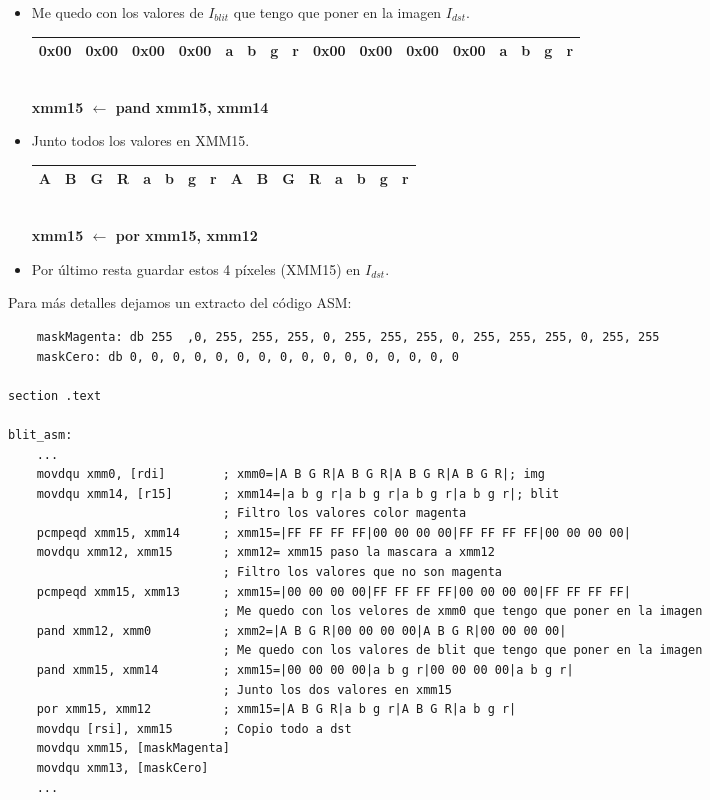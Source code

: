 \begin{itemize}
	\item Me quedo con los valores de $I_{blit}$ que tengo que poner en la imagen $I_{dst}$.
		\begin{center}
		   \begin{tabular}{| c | c | c | c || c | c | c | c || c | c | c | c || c | c | c | c |}
			 \hline
			 0x00 & 0x00 & 0x00 & 0x00 & a & b & g & r & 0x00 & 0x00 & 0x00 & 0x00 & a & b & g & r \\ \hline
		   \end{tabular}
		   \\ \textbf{xmm15 $\gets$ pand xmm15, xmm14}
		\end{center}		
	
	\item Junto todos los valores en XMM15.
		\begin{center}
		   \begin{tabular}{| c | c | c | c || c | c | c | c || c | c | c | c || c | c | c | c |}
			 \hline
			 A & B & G & R & a & b & g & r & A & B & G & R & a & b & g & r \\ \hline
		   \end{tabular}
		   \\ \textbf{xmm15 $\gets$ por xmm15, xmm12}
		\end{center}		
	\item Por último resta guardar estos 4 píxeles (XMM15) en $I_{dst}$.

\end{itemize}

Para más detalles dejamos un extracto del código ASM:

\begin{codesnippet}
\begin{verbatim}
    maskMagenta: db 255	 ,0, 255, 255, 255, 0, 255, 255, 255, 0, 255, 255, 255, 0, 255, 255
    maskCero: db 0, 0, 0, 0, 0, 0, 0, 0, 0, 0, 0, 0, 0, 0, 0, 0 

section .text

blit_asm:
    ...
    movdqu xmm0, [rdi]        ; xmm0=|A B G R|A B G R|A B G R|A B G R|; img	
    movdqu xmm14, [r15]       ; xmm14=|a b g r|a b g r|a b g r|a b g r|; blit
                              ; Filtro los valores color magenta
    pcmpeqd xmm15, xmm14      ; xmm15=|FF FF FF FF|00 00 00 00|FF FF FF FF|00 00 00 00| 
    movdqu xmm12, xmm15       ; xmm12= xmm15 paso la mascara a xmm12 
                              ; Filtro los valores que no son magenta
    pcmpeqd xmm15, xmm13      ; xmm15=|00 00 00 00|FF FF FF FF|00 00 00 00|FF FF FF FF|
                              ; Me quedo con los velores de xmm0 que tengo que poner en la imagen
    pand xmm12, xmm0          ; xmm2=|A B G R|00 00 00 00|A B G R|00 00 00 00|
                              ; Me quedo con los valores de blit que tengo que poner en la imagen
    pand xmm15, xmm14         ; xmm15=|00 00 00 00|a b g r|00 00 00 00|a b g r|
                              ; Junto los dos valores en xmm15
    por xmm15, xmm12          ; xmm15=|A B G R|a b g r|A B G R|a b g r|
    movdqu [rsi], xmm15       ; Copio todo a dst
    movdqu xmm15, [maskMagenta]
    movdqu xmm13, [maskCero]
    ...
\end{verbatim}
\end{codesnippet}
